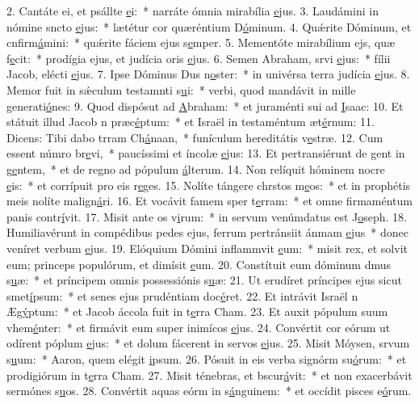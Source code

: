 2. Cantáte ei, et psállte \uline{e}i:~* narráte ómnia mirabília \uline{e}jus.
3. Laudámini in nómine sncto \uline{e}jus:~* lætétur cor quæréntium D\uline{ó}minum.
4. Quǽrite Dóminum, et cnfirm\uline{á}mini:~* quǽrite fáciem ejus s\uline{e}mper.
5. Mementóte mirabílium ejs, quæ f\uline{e}cit:~* prodígia ejus, et judícia oris \uline{e}jus.
6. Semen Abraham, srvi \uline{e}jus:~* fílii Jacob, elécti \uline{e}jus.
7. Ipse Dóminus Dus n\uline{o}ster:~* in univérsa terra judícia \uline{e}jus.
8. Memor fuit in sǽculum testamnti s\uline{u}i:~* verbi, quod mandávit in mille generati\uline{ó}nes:
9. Quod dispósut ad \uline{A}braham:~* et juraménti sui ad \uline{I}saac:
10. Et státuit illud Jacob n præc\uline{é}ptum:~* et Israël in testaméntum æt\uline{é}rnum:
11. Dicens: Tibi dabo trram Ch\uline{á}naan,~* funículum hereditátis v\uline{e}stræ.
12. Cum essent númro br\uline{e}vi,~* paucíssimi et íncolæ \uline{e}jus:
13. Et pertransiérunt de gent in g\uline{e}ntem,~* et de regno ad pópulum \uline{á}lterum.
14. Non relíquit hóminem nocre \uline{e}is:~* et corrípuit pro eis r\uline{e}ges.
15. Nolíte tángere chrstos m\uline{e}os:~* et in prophétis meis nolíte malign\uline{á}ri.
16. Et vocávit famem sper t\uline{e}rram:~* et omne firmaméntum panis contr\uline{í}vit.
17. Misit ante os v\uline{i}rum:~* in servum venúmdatus est J\uline{o}seph.
18. Humiliavérunt in compédibus pedes ejus, ferrum pertránsiit ánmam \uline{e}jus~* donec veníret verbum \uline{e}jus.
19. Elóquium Dómini inflammvit \uline{e}um:~* misit rex, et solvit eum; princeps populórum, et dimísit \uline{e}um.
20. Constítuit eum dóminum dmus s\uline{u}æ:~* et príncipem omnis possessiónis s\uline{u}æ:
21. Ut erudíret príncipes ejus sicut smet\uline{í}psum:~* et senes ejus prudéntiam doc\uline{é}ret.
22. Et intrávit Israël n Æg\uline{ý}ptum:~* et Jacob áccola fuit in t\uline{e}rra Cham.
23. Et auxit pópulum suum vhem\uline{é}nter:~* et firmávit eum super inimícos \uline{e}jus.
24. Convértit cor eórum ut odírent póplum \uline{e}jus:~* et dolum fácerent in servos \uline{e}jus.
25. Misit Móysen, srvum s\uline{u}um:~* Aaron, quem elégit \uline{i}psum.
26. Pósuit in eis verba signórm su\uline{ó}rum:~* et prodigiórum in t\uline{e}rra Cham.
27. Misit ténebras, et bscur\uline{á}vit:~* et non exacerbávit sermónes s\uline{u}os.
28. Convértit aquas eórm in s\uline{á}nguinem:~* et occídit pisces e\uline{ó}rum.

